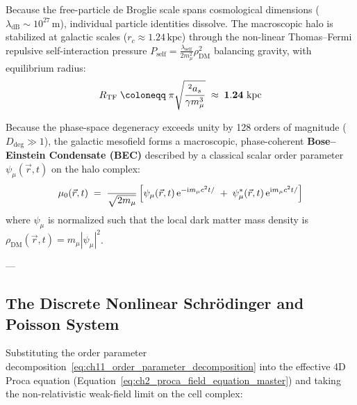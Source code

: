 \documentclass[
    12pt,
    a4paper,
    headings=normal,
    twoside=false,
    open=any,
    parskip=half
]{scrbook}
\let\hbar\relax
\newcommand{\iu}{\mathrm{i}}
\newcommand{\eu}{\mathrm{e}}
\begin{document}
Because the free-particle de Broglie scale spans cosmological dimensions ($\lambda_{\text{dB}} \sim 10^{27}\,\text{m}$), individual particle identities dissolve. The macroscopic halo is stabilized at galactic scales ($r_c \approx 1.24\,\text{kpc}$) through the non-linear Thomas--Fermi repulsive self-interaction pressure $P_{\text{self}} = \frac{\lambda_{\text{self}}}{2m_\mu^2}\rho_{\text{DM}}^2$ balancing gravity, with equilibrium radius:
\begin{equation}
R_{\text{TF}} \;\coloneqq\; \pi \sqrt{\frac{\hbar^2 a_s}{\gamma m_\mu^3}} \;\approx\; \mathbf{1.24 \text{ kpc}}
\label{eq:ch11_thomas_fermi_radius}
\end{equation}

\begin{phystheorem}\label{thm:ch11_mesofield_bec_condensation}
Because the phase-space degeneracy exceeds unity by 128 orders of magnitude ($D_{\text{deg}} \gg 1$), the galactic mesofield forms a macroscopic, phase-coherent \textbf{Bose--Einstein Condensate (BEC)} described by a classical scalar order parameter $\psi_\mu(\vec{r}, t)$ on the halo complex:
\begin{equation}
\mu_0(\vec{r}, t) \;=\; \frac{\hbar}{\sqrt{2 m_\mu}} \left[ \psi_\mu(\vec{r}, t) \, \eu^{-\iu m_\mu c^2 t / \hbar} \;+\; \psi_\mu^*(\vec{r}, t) \, \eu^{\iu m_\mu c^2 t / \hbar} \right]
\label{eq:ch11_order_parameter_decomposition}
\end{equation}
where $\psi_\mu$ is normalized such that the local dark matter mass density is $\rho_{\text{DM}}(\vec{r}, t) = m_\mu |\psi_\mu|^2$.
\end{phystheorem}

---

\subsection{The Discrete Nonlinear Schrödinger and Poisson System}

Substituting the order parameter decomposition~\eqref{eq:ch11_order_parameter_decomposition} into the effective 4D Proca equation (Equation~\ref{eq:ch2_proca_field_equation_master}) and taking the non-relativistic weak-field limit on the cell complex:
\end{document}
